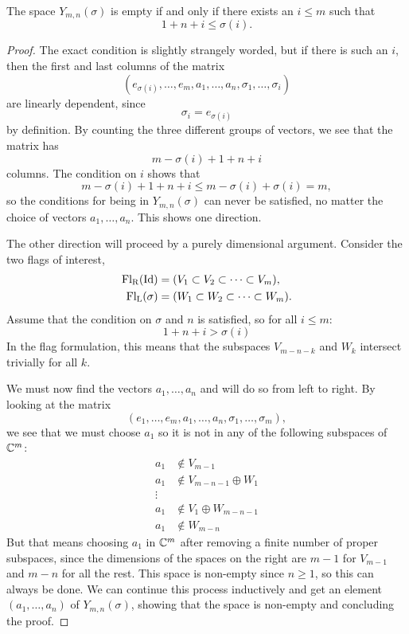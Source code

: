 \begin{theorem}
  \label{thm:ikke-tom}
  The space $Y_{m,n}(\sigma)$ is empty if and only if there exists an
  $i \leq m$ such that
  \[ 1 + n + i \leq \sigma(i). \]
\end{theorem}
\begin{proof}
  The exact condition is slightly strangely worded, but if there is
  such an $i$, then the first and last columns of the matrix
  \[ (e_{\sigma(i)},\dots,e_m,a_1,\dots,a_n,\sigma_1,\dots,\sigma_i) \]
  are linearly dependent, since
  \[ \sigma_i = e_{\sigma(i)} \]
  by definition. By counting the three different groups of vectors, we
  see that the matrix has
  \[ m - \sigma(i) + 1 + n + i \]
  columns. The condition on $i$ shows that
  \[ m - \sigma(i) + 1 + n + i \leq m - \sigma(i) + \sigma(i) = m, \]
  so the conditions for being in $Y_{m,n}(\sigma)$ can never be
  satisfied, no matter the choice of vectors $a_1,\dots,a_n$. This
  shows one direction.

  The other direction
  will proceed by a purely dimensional argument. Consider the two
  flags of interest,
  \begin{align*}
    \mathrm{Fl_R}(\operatorname{Id}) &= (V_1 \subset V_2 \subset \dots \subset V_m),
    \\
    \mathrm{Fl_L}(\sigma) &= (W_1 \subset W_2 \subset \dots \subset
                            W_m).
  \end{align*}
  Assume that the condition on $\sigma$ and $n$ is satisfied, so for
  all $i \leq m$:
  \[ 1 + n + i > \sigma(i) \]
  In the flag formulation, this means that the subspaces $V_{m-n-k}$
  and $W_k$ intersect trivially for all $k$.

  We must now find the vectors $a_1,\dots,a_n$ and will do so from
  left to right. By looking at the matrix
  \[ \left( e_1, \dots, e_m, a_1, \dots, a_n, \sigma_1, \dots,
    \sigma_m \right), \]
  we see that we must choose $a_1$ so it is not in any of the
  following subspaces of $\mathbb{C}^m$:
  \begin{align*}
    a_1 &\not\in V_{m-1} \\
    a_1 &\not\in V_{m-n-1} \oplus W_1 \\
    \vdots & \\
    a_1 &\not\in V_1\oplus W_{m-n-1} \\
    a_1 &\not\in W_{m-n}
  \end{align*}
  But that means choosing $a_1$ in $\mathbb{C}^m$ after removing a
  finite number of proper subspaces, since the dimensions of the
  spaces on the right are $m-1$ for $V_{m-1}$ and $m-n$ for
  all the rest. This space is non-empty since $n\geq 1$, so this can
  always be done. We can continue this process inductively and get an
  element $(a_1,\dots,a_n)$ of $Y_{m,n}(\sigma)$, showing that the
  space is non-empty and concluding the proof.
\end{proof}

